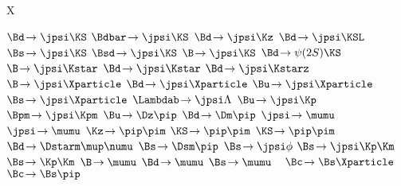 
\newmathsymbol{\BF}           {\xspace}
\newmathsymbol{\BR}           {\BF}

\renewcommand{\to}            {\ensuremath{\rightarrow}\xspace}
\newcommand{\decay}[2]        {\ensuremath{#1\!\to #2}\xspace}
\newcommand{\decaybf}[2]      {\ensuremath{#1\!\pmb{\to} #2}\xspace} %

\newmathsymbol{\Xparticle}      {X\xspace}

\newmathsymbol{\BdToJpsiKS}      {\decay{\Bd}{\jpsi\KS}}
\newmathsymbol{\BdbarToJpsiKS}   {\decay{\Bdbar}{\jpsi\KS}}
\newmathsymbol{\BdToJpsiKz}      {\decay{\Bd}{\jpsi\Kz}}
\newmathsymbol{\BdToJpsiKSL}     {\decay{\Bd}{\jpsi\KSL}}
\newmathsymbol{\BsToJpsiKS}      {\decay{\Bs}{\jpsi\KS}}
\newmathsymbol{\BsdToJpsiKS}     {\decay{\Bsd}{\jpsi\KS}}
\newmathsymbol{\BToJpsiKS}       {\decay{\B}{\jpsi\KS}}
\newmathsymbol{\BdToPsiTwoSKS}   {\decay{\Bd}{\psi(2S)\KS}}
\newmathsymbol{\BToJpsiKstar}    {\decay{\B}{\jpsi\Kstar}}
\newmathsymbol{\BdToJpsiKstar}   {\decay{\Bd}{\jpsi\Kstar}}
\newmathsymbol{\BdToJpsiKstarz}  {\decay{\Bd}{\jpsi\Kstarz}}
\newmathsymbol{\BToJpsiX}        {\decay{\B}{\jpsi\Xparticle}}
\newmathsymbol{\BdToJpsiX}       {\decay{\Bd}{\jpsi\Xparticle}}
\newmathsymbol{\BuToJpsiX}       {\decay{\Bu}{\jpsi\Xparticle}}
\newmathsymbol{\BsToJpsiX}       {\decay{\Bs}{\jpsi\Xparticle}}
\newmathsymbol{\LbToJpsiLambda}  {\decay{\Lambdab}{\jpsi\Lambda}}
\newmathsymbol{\BuToJpsiK}       {\decay{\Bu}{\jpsi\Kp}}
\newmathsymbol{\BuToJpsiKcc}     {\decay{\Bpm}{\jpsi\Kpm}}
\newmathsymbol{\BuToDpi}         {\decay{\Bu}{\Dz\pip}}
\newmathsymbol{\BdToDpi}         {\decay{\Bd}{\Dm\pip}}
\newmathsymbol{\JpsiToMuMu}      {\decay{\jpsi}{\mumu}}
\newmathsymbol{\JpsiTomumu}      {\decay{\jpsi}{\mumu}}
\newmathsymbol{\KzToPiPi}        {\decay{\Kz}{\pip\pim}}
\newmathsymbol{\KSToPiPi}        {\decay{\KS}{\pip\pim}}
\newmathsymbol{\KSTopipi}        {\decay{\KS}{\pip\pim}}
\newmathsymbol{\BdToDstarmunu}   {\decay{\Bd}{\Dstarm\mup\numu}}
\newmathsymbol{\BsToDspi}        {\decay{\Bs}{\Dsm\pip}}
\newmathsymbol{\BsToJpsiphi}     {\decay{\Bs}{\jpsi\phi}}
\newmathsymbol{\BsToJpsiKK}      {\decay{\Bs}{\jpsi\Kp\Km}}
\newmathsymbol{\BsToKK}          {\decay{\Bs}{\Kp\Km}}
\newmathsymbol{\BToMuMu}         {\decay{\B}{\mumu}}
\newmathsymbol{\BdToMuMu}        {\decay{\Bd}{\mumu}}
\newmathsymbol{\BsToMuMu}        {\decay{\Bs}{\mumu}}
\newmathsymbol{\inclJPsi}        {\ \jpsi}
\newmathsymbol{\BcToBsX}         {\decay{\Bc}{\Bs\Xparticle}}
\newmathsymbol{\BcToBspi}        {\decay{\Bc}{\Bs\pip}}

